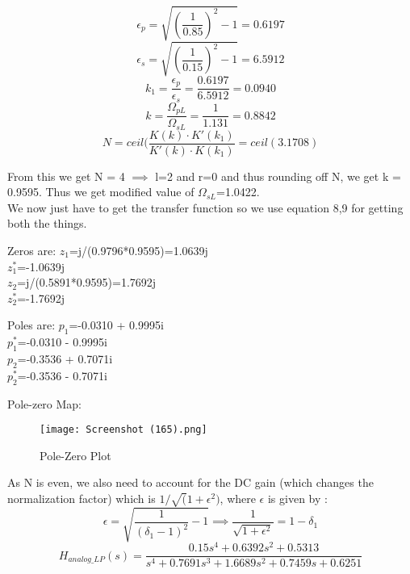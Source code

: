 \documentclass{article}
\begin{document}
\begin{equation*}
    \epsilon_p=\sqrt{(\frac{1}{0.85})^2-1}=0.6197 
\end{equation*}
\begin{equation*}
    \epsilon_s=\sqrt{(\frac{1}{0.15})^2-1}=6.5912 
\end{equation*}
\begin{equation*}
    k_1 = \frac{\epsilon_p}{\epsilon_s} = \frac{0.6197}{6.5912} = 0.0940
\end{equation*}
\begin{equation*}
    k = \frac{\Omega_{pL}}{\Omega_{sL}} = \frac{1}{1.131} = 0.8842
\end{equation*}
\begin{equation*}
N = ceil({\frac{K(k)\cdot K'(k_1)}{K'(k)\cdot K(k_1)}}=ceil(3.1708)
\end{equation*}

From this we get N = 4 $\implies$ l=2 and r=0 and thus rounding off N, we get k = 0.9595. 
Thus we get modified value of $\Omega_{sL}$=1.0422.\\

We now just have to get the transfer function so we use equation 8,9 for getting both the things.\\
\begin{center}
Zeros are:
$z_1$=j/(0.9796*0.9595)=1.0639j\\
$z_1^*$=-1.0639j \\
$z_2$=j/(0.5891*0.9595)=1.7692j\\
$z_2^*$=-1.7692j \\
\end{center}
\begin{center}
Poles are:
$p_1$=-0.0310 + 0.9995i \\    
$p_1^*$=-0.0310 - 0.9995i \\
$p_2$=-0.3536 + 0.7071i \\
$p_2^*$=-0.3536 - 0.7071i \\
\end{center}

Pole-zero Map:
\begin{figure}[H]
    \centering
    \hspace*{-3.8cm}
    \texttt{[image: Screenshot (165).png]}
    \caption{Pole-Zero Plot}
    \label{fig:my_label}
\end{figure}

As N is even, we also need to account for the DC gain (which changes the normalization factor) which is $1/\sqrt(1+\epsilon^2)$, where $\epsilon$ is given by :
\begin{equation*}
    \epsilon = \sqrt{\frac{1}{(\delta_1 - 1)^2} - 1} \implies \frac{1}{\sqrt{1 + \epsilon^2}} = 1 - \delta_1
\end{equation*}
\begin{equation}
    H_{analog\_LP}(s) = \frac{0.15s^4 + 0.6392s^2 + 0.5313}{s^4 + 0.7691s^3 + 1.6689s^2 + 0.7459s + 0.6251}
\end{equation}
\end{document}
